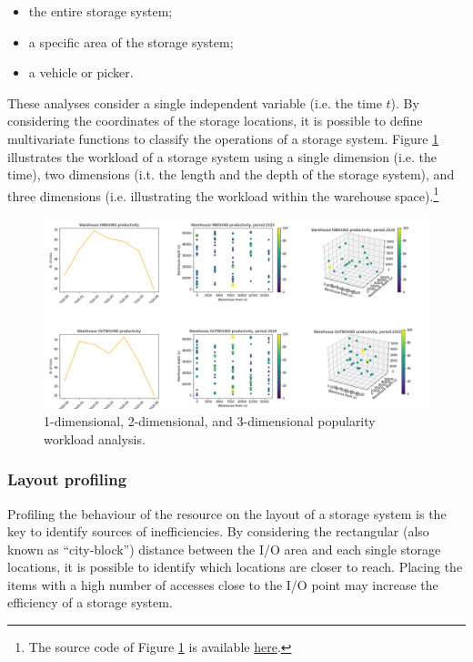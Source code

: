 \begin{itemize}
    \item the entire storage system;
    \item a specific area of the storage system;
    \item a vehicle or picker.

\end{itemize}

These analyses consider a single independent variable (i.e. the time $t$). By considering the coordinates of the storage locations, it is possible to define multivariate functions to classify the operations of a storage system. Figure \ref{fig_workload_profile2D} illustrates the workload of a storage system using a single dimension (i.e. the time), two dimensions (i.t. the length and the depth of the storage system), and three dimensions (i.e. illustrating the workload within the warehouse space).\footnote{The source code of Figure \ref{fig_workload_profile2D} is available \href{https://github.com/aletuf93/logproj/blob/master/examples/WH_01\%20Warehouse\%20productivity\%20assessment.ipynb}{here}.}


\begin{figure}[hbt!]
\centering
\includegraphics[width=1.0\textwidth]{SectionWarehouses/control_figures/fig_workload_profile2D.png}
\captionsetup{type=figure}
\caption{1-dimensional, 2-dimensional, and 3-dimensional popularity workload analysis.}
\label{fig_workload_profile2D}
\end{figure}

\clearpage

\subsubsection{Layout profiling}
Profiling the behaviour of the resource on the layout of a storage system is the key to identify sources of inefficiencies. By considering the rectangular (also known as “city-block”) distance between the I/O area and each single storage locations, it is possible to identify which locations are closer to reach. Placing the items with a high number of accesses close to the I/O point may increase the efficiency of a storage system.\par

